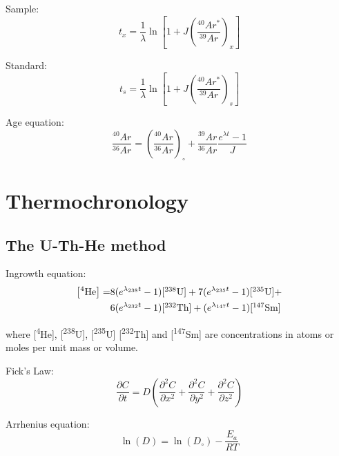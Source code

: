 \documentclass{article}
\begin{document}
\begin{multicols}{3}
Sample:
\begin{equation}
t_x = \frac{1}{\lambda} \ln\left[
1 + J \left(\frac{^{40}Ar^*}{^{39}Ar}\right)_x 
\right]
\label{eq:Ar-Ar}
\end{equation}

Standard:
\begin{equation}
t_s = \frac{1}{\lambda} \ln\left[
1 + J \left(\frac{^{40}Ar^*}{^{39}Ar}\right)_s 
\right]
\label{eq:J}
\end{equation}

Age equation:
\begin{equation}
\frac{{}^{40}Ar}{{}^{36}Ar} =
\left(\frac{{}^{40}Ar}{{}^{36}Ar}\right)_\circ +
\frac{{}^{39}Ar}{{}^{36}Ar}\frac{e^{\lambda t} - 1}{J}
\label{eq:Ar-Ar-isochron}
\end{equation}

\section{Thermochronology}

\subsection{The U-Th-He method}
\label{sec:U-Th-He}

Ingrowth equation:
\begin{equation}
\begin{split}
  \left[^4\mbox{He}\right] = &
  8 (e^{\lambda_{238}t} - 1) \mbox{[\textsuperscript{238}U]} + 
  7 (e^{\lambda_{235}t} - 1) \mbox{[\textsuperscript{235}U]} + \\
  ~ & 6 (e^{\lambda_{232}t} - 1) \mbox{[\textsuperscript{232}Th]} +
  (e^{\lambda_{147}t} - 1) \mbox{[\textsuperscript{147}Sm]}
\end{split}
\label{eq:U-Th-He}
\end{equation}

where [\textsuperscript{4}He], [\textsuperscript{238}U],
[\textsuperscript{235}U] [\textsuperscript{232}Th] and
[\textsuperscript{147}Sm] are concentrations in atoms or moles per
unit mass or volume.

Fick's Law:
\begin{equation}
\frac{\partial C}{\partial t} = D \left(
\frac{\partial^2C}{\partial x^2} + \frac{\partial^2C}{\partial y^2} +
\frac{\partial^2C}{\partial z^2}\right)
\label{eq:fick}
\end{equation}

Arrhenius equation:
\begin{equation}
\ln(D) = \ln(D_\circ) - \frac{E_a}{RT}
\label{eq:logD}
\end{equation}


\end{multicols}
\end{document}
